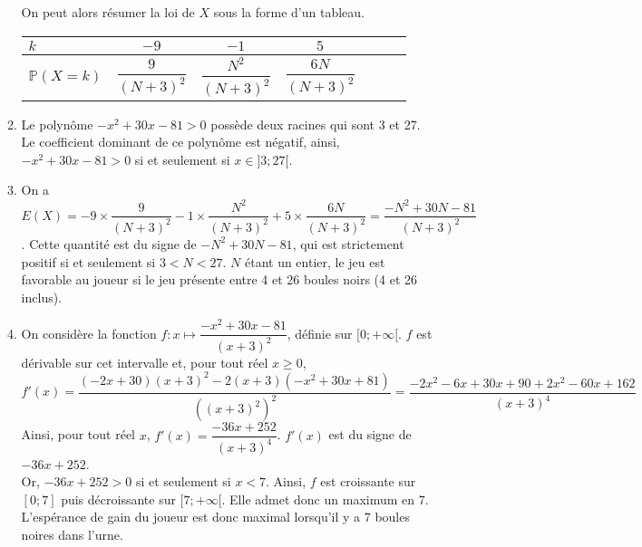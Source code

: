 \documentclass[11pt,fleqn, openany]{book} %
\begin{document}
\begin{solution}
\begin{enumerate}
\begin{enumerate}
On peut alors résumer la loi de $X$ sous la forme d'un tableau.

\begin{center}
\begin{tabular}{|l|c|c|c|c|c|c|}
\hline
$k$ & $-9$ & $-1$ & $5$ \\
\hline
$\mathbb{P}(X=k)$ & $\dfrac{9}{(N+3)^2}$  & $\dfrac{N^2}{(N+3)^2}$&$\dfrac{6N}{(N+3)^2}$\\
\hline \end{tabular}
\end{center}
 

\item Le polynôme  $-x^2+30x-81>0$ possède deux racines qui sont 3 et 27. Le coefficient dominant de ce polynôme est négatif, ainsi, $-x^2+30x-81>0$ si et seulement si $x\in]3;27[$.
\item On a $E(X)=-9\times \dfrac{9}{(N+3)^2}-1 \times \dfrac{N^2}{(N+3)^2}+5 \times \dfrac{6N}{(N+3)^2}=\dfrac{-N^2+30N-81}{(N+3)^2}$. Cette quantité est du signe de $-N^2+30N-81$, qui est strictement positif si et seulement si $3<N<27$. $N$ étant un entier, le jeu est favorable au joueur si le jeu présente entre 4 et 26 boules noirs (4 et 26 inclus).
\item On considère la fonction $f:x\mapsto  \dfrac{-x^2+30x-81}{(x+3)^2}$, définie sur $[0;+\infty[$. $f$ est dérivable sur cet intervalle et, pour tout réel $x\geqslant 0$, \[f'(x)=\dfrac{(-2x+30)(x+3)^2-2(x+3)(-x^2+30x+81)}{((x+3)^2)^2}=\dfrac{-2x^2-6x+30x+90+2x^2-60x+162}{(x+3)^4}\]
Ainsi, pour tout réel $x$, $f'(x)=\dfrac{-36x+252}{(x+3)^4}$. $f'(x)$ est du signe de $-36x+252$. \\
Or, $-36x+252>0$ si et seulement si $x<7$. Ainsi, $f$ est croissante sur $[0;7]$ puis décroissante sur $[7;+\infty[$. Elle admet donc un maximum en 7. L'espérance de gain du joueur est donc maximal lorsqu'il y a 7 boules noires dans l'urne.
\end{enumerate}\end{enumerate}\end{solution}
\end{document}
